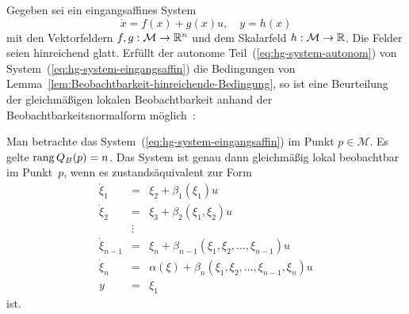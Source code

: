 Gegeben sei ein eingangsaffines System
\begin{equation}
\dot{x}=f(x)+g(x)u,\quad y=h(x)\label{eq:hg-system-eingangsaffin}
\end{equation}
mit den Vektorfeldern $f,g:\mathcal{M}\to{\mathbb{R}}^{n}$ und dem Skalarfeld
$h:\mathcal{M}\to{\mathbb{R}}$. Die Felder seien hinreichend glatt. Erfüllt
der autonome Teil~(\ref{eq:hg-system-autonom}) von System~(\ref{eq:hg-system-eingangsaffin})
die Bedingungen von Lemma~\ref{lem:Beobachtbarkeit-hinreichende-Bedingung},
so ist eine Beurteilung der gleichmäßigen lokalen Beobachtbarkeit
anhand der Beobachtbarkeitsnormalform
möglich~\cite{gauthier81,gauthier92}:
\begin{theorem}
\label{thm:hg-Beobachtbarkeit-nicht-autonom}Man betrachte das System~(\ref{eq:hg-system-eingangsaffin})
im Punkt $p\in\mathcal{M}$. Es gelte ${\operatorname{rang}}\,Q_{B}(p)=n$. Das System
ist genau dann gleichmäßig lokal beobachtbar im Punkt~$p$, wenn
es zustands\-äquivalent zur Form 
\begin{equation}
\begin{array}{lcl}
\dot{\xi}_{1} & = & \xi_{2}+\beta_{1}(\xi_{1})u\\
\dot{\xi}_{2} & = & \xi_{3}+\beta_{2}(\xi_{1},\xi_{2})u\\
 & \vdots\\
\dot{\xi}_{n-1} & = & \xi_{n}+\beta_{n-1}(\xi_{1},\xi_{2},\ldots,\xi_{n-1})u\\
\dot{\xi}_{n} & = & \alpha(\xi)+\beta_{n}(\xi_{1},\xi_{2},\ldots,\xi_{n-1},\xi_{n})u\\
y & = & \xi_{1}
\end{array}\label{eq:Beobachtbarkeits-NF-nicht-autonom}
\end{equation}
ist.
\end{theorem}
